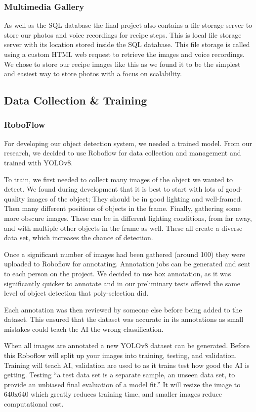 \documentclass{article}
\begin{document}
    \subsubsection{Multimedia Gallery}\label{multimediaGallery}
    As well as the SQL database the final project also contains a file storage server to store our photos and voice recordings for recipe steps. This is local file storage server with its location stored inside the SQL database.
    This file storage is called using a custom HTML web request to retrieve the images and voice recordings. We chose to store our recipe images like this as we found it to be the simplest and easiest way to store photos with a focus on scalability.

    \subsection{Data Collection \& Training}
    \subsubsection{RoboFlow}
    For developing our object detection system, we needed a trained model. From our research, we decided to use Roboflow for data collection and management and trained with YOLOv8.
    
To train, we first needed to collect many images of the object we wanted to detect. We found during development that it is best to start with lots of good-quality images of the object; They should be in good lighting and well-framed. Then many different positions of objects in the frame. Finally, gathering some more obscure images. These can be in different lighting conditions, from far away, and with multiple other objects in the frame as well. These all create a diverse data set, which increases the chance of detection.

Once a significant number of images had been gathered (around 100) they were uploaded to Roboflow for annotating. Annotation jobs can be generated and sent to each person on the project. We decided to use box annotation, as it was significantly quicker to annotate and in our preliminary tests offered the same level of object detection that poly-selection did.

Each annotation was then reviewed by someone else before being added to the dataset. This ensured that the dataset was accurate in its annotations as small mistakes could teach the AI the wrong classification.

When all images are annotated a new YOLOv8 dataset can be generated. Before this Roboflow will split up your images into training, testing, and validation. Training will teach AI, validation are used to as it trains test how good the AI is getting. Testing “a test data set is a separate sample, an unseen data set, to provide an unbiased final evaluation of a model fit.” \cite{trainvalidtest} It will resize the image to 640x640 which greatly reduces training time, and smaller images reduce computational cost. 
\end{document}

